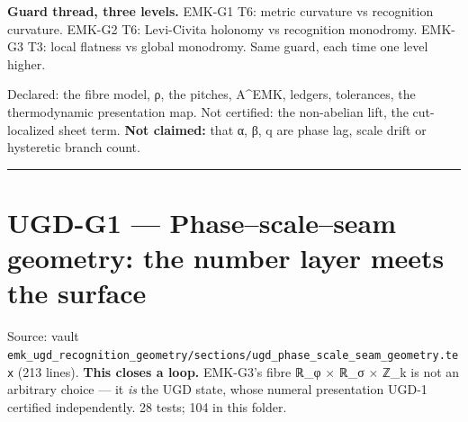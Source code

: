 \textbf{Guard thread, three levels.} EMK-G1 T6: metric curvature vs
recognition curvature. EMK-G2 T6: Levi-Civita holonomy vs recognition
monodromy. EMK-G3 T3: local flatness vs global monodromy. Same guard,
each time one level higher.

Declared: the fibre model, ρ, the pitches, A\^{}EMK, ledgers, tolerances,
the thermodynamic presentation map. Not certified: the non-abelian
lift, the cut-localized sheet term. \textbf{Not claimed:} that α, β, q are
phase lag, scale drift or hysteretic branch count.

\begin{center}\rule{0.5\linewidth}{0.5pt}\end{center}

\hypertarget{ugd-g1-phasescaleseam-geometry-the-number-layer-meets-the-surface}{%
\chapter{UGD-G1 --- Phase--scale--seam geometry: the number layer meets the surface}\label{ugd-g1-phasescaleseam-geometry-the-number-layer-meets-the-surface}}

Source: vault \texttt{emk\_ugd\_recognition\_geometry/sections/ugd\_phase\_scale\_seam\_geometry.tex}
(213 lines). \textbf{This closes a loop.} EMK-G3's fibre ℝ\_φ × ℝ\_σ × ℤ\_k is
not an arbitrary choice --- it \emph{is} the UGD state, whose numeral
presentation UGD-1 certified independently. 28 tests; 104 in this folder.

